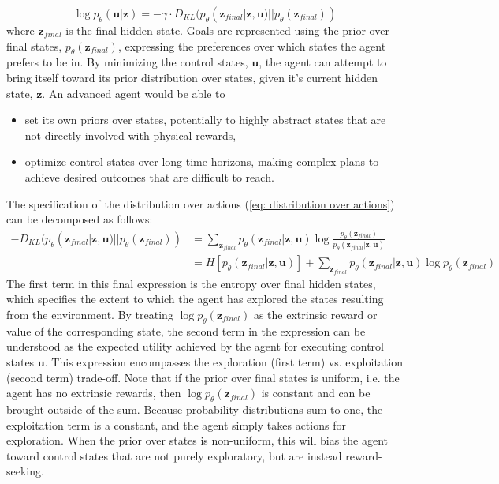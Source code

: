 \begin{equation}
    \log p_\theta (\mathbf{u} | \mathbf{z}) = - \gamma \cdot D_{KL} (p_\theta (\mathbf{z}_{final} | \mathbf{z}, \mathbf{u}) || p_\theta (\mathbf{z}_{final}))
    \label{eq: distribution over actions}
\end{equation}
where $\mathbf{z}_{final}$ is the final hidden state. Goals are represented using the prior over final states, $p_\theta (\mathbf{z}_{final})$, expressing the preferences over which states the agent prefers to be in. By minimizing the control states, $\mathbf{u}$, the agent can attempt to bring itself toward its prior distribution over states, given it's current hidden state, $\mathbf{z}$. An advanced agent would be able to
\begin{itemize}
    \item set its own priors over states, potentially to highly abstract states that are not directly involved with physical rewards,
    \item optimize control states over long time horizons, making complex plans to achieve desired outcomes that are difficult to reach.
\end{itemize}
The specification of the distribution over actions (\ref{eq: distribution over actions}) can be decomposed as follows:
\begin{align}
    - D_{KL} (p_\theta (\mathbf{z}_{final} | \mathbf{z}, \mathbf{u}) || p_\theta (\mathbf{z}_{final})) & = \sum_{\mathbf{z}_{final}} p_\theta (\mathbf{z}_{final} | \mathbf{z}, \mathbf{u}) \log \frac{p_\theta (\mathbf{z}_{final})}{p_\theta (\mathbf{z}_{final} | \mathbf{z}, \mathbf{u})} \\
    & = H \left[ p_\theta (\mathbf{z}_{final} | \mathbf{z}, \mathbf{u}) \right] + \sum_{\mathbf{z}_{final}} p_\theta (\mathbf{z}_{final} | \mathbf{z}, \mathbf{u}) \log p_\theta (\mathbf{z}_{final})
\end{align}
The first term in this final expression is the entropy over final hidden states, which specifies the extent to which the agent has explored the states resulting from the environment. By treating $\log p_\theta (\mathbf{z}_{final})$ as the extrinsic reward or value of the corresponding state, the second term in the expression can be understood as the expected utility achieved by the agent for executing control states $\mathbf{u}$. This expression encompasses the exploration (first term) vs. exploitation (second term) trade-off. Note that if the prior over final states is uniform, i.e. the agent has no extrinsic rewards, then $\log p_\theta (\mathbf{z}_{final})$ is constant and can be brought outside of the sum. Because probability distributions sum to one, the exploitation term is a constant, and the agent simply takes actions for exploration. When the prior over states is non-uniform, this will bias the agent toward control states that are not purely exploratory, but are instead reward-seeking.

